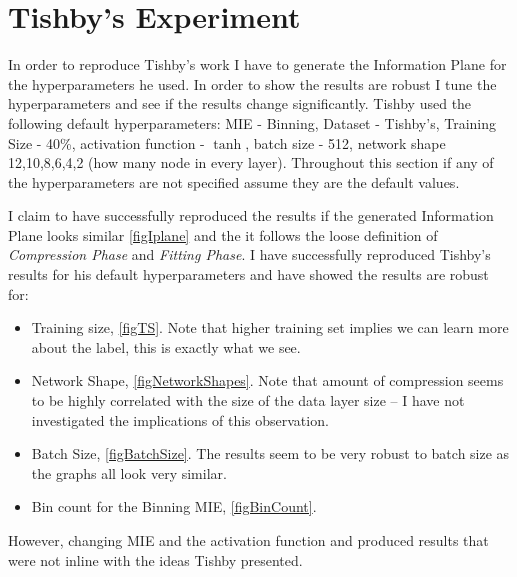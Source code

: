\documentclass[dissertation.tex]{subfiles}
\begin{document}
\section{Tishby's Experiment}

In order to reproduce Tishby's work I have to generate the Information Plane for
the hyperparameters he used. In order to show the results are robust I tune the
hyperparameters and see if the results change significantly. Tishby used the
following default hyperparameters: MIE - Binning, Dataset - Tishby's, Training
Size - 40\%, activation function - $\tanh$, batch size - 512, network shape
12,10,8,6,4,2 (how many node in every layer). Throughout this section if any of
the hyperparameters are not specified assume they are the default values. 

I claim to have successfully reproduced the results if the generated Information
Plane looks similar \autoref{figIplane} and the it follows the loose definition
of \emph{Compression Phase} and \emph{Fitting Phase}. I have successfully
reproduced Tishby's results for his default hyperparameters and have showed the
results are robust for:
\begin{itemize}
  \item{
      Training size, \autoref{figTS}. Note that higher training set implies we
      can learn more about the label, this is exactly what we see.
    }
  \item{
      Network Shape, \autoref{figNetworkShapes}. Note that amount of compression
      seems to be highly correlated with the size of the data layer size -- I
      have not investigated the implications of this observation.
    }
  \item{
      Batch Size, \autoref{figBatchSize}. The results seem to be very robust to
      batch size as the graphs all look very similar.
    }
  \item{
      Bin count for the Binning MIE, \autoref{figBinCount}.
    }
\end{itemize}

However, changing MIE and the activation function and produced results that were
not inline with the ideas Tishby presented.
\end{document}

